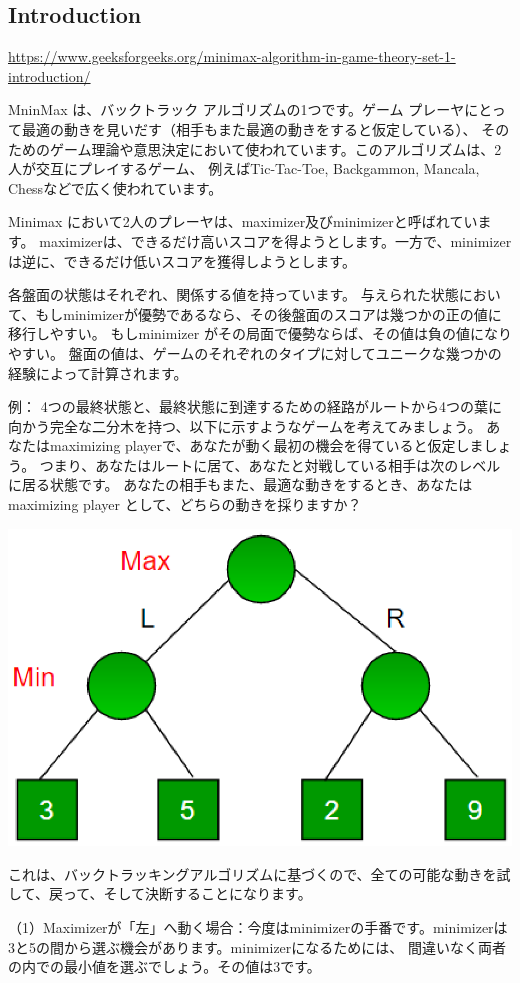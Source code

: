 \documentclass[uplatex,a4paper,11pt,oneside,openany]{jsbook}
\begin{document}
\subsection{Introduction}

\url{https://www.geeksforgeeks.org/minimax-algorithm-in-game-theory-set-1-introduction/}

MninMax は、バックトラック アルゴリズムの1つです。ゲーム プレーヤにとって最適の動きを見いだす（相手もまた最適の動きをすると仮定している）、
そのためのゲーム理論や意思決定において使われています。このアルゴリズムは、2人が交互にプレイするゲーム、
例えばTic-Tac-Toe, Backgammon, Mancala, Chessなどで広く使われています。

Minimax において2人のプレーヤは、maximizer及びminimizerと呼ばれています。
maximizerは、できるだけ高いスコアを得ようとします。一方で、minimizerは逆に、できるだけ低いスコアを獲得しようとします。

各盤面の状態はそれぞれ、関係する値を持っています。
与えられた状態において、もしminimizerが優勢であるなら、その後盤面のスコアは幾つかの正の値に移行しやすい。
もしminimizer がその局面で優勢ならば、その値は負の値になりやすい。
盤面の値は、ゲームのそれぞれのタイプに対してユニークな幾つかの経験によって計算されます。

例：
4つの最終状態と、最終状態に到達するための経路がルートから4つの葉に向かう完全な二分木を持つ、以下に示すようなゲームを考えてみましょう。
あなたはmaximizing playerで、あなたが動く最初の機会を得ていると仮定しましょう。
つまり、あなたはルートに居て、あなたと対戦している相手は次のレベルに居る状態です。
あなたの相手もまた、最適な動きをするとき、あなたはmaximizing player として、どちらの動きを採りますか？

\begin{center}
  \includegraphics[width=0.4\hsize]{figures/eps/minmax001.eps}
\end{center}

これは、バックトラッキングアルゴリズムに基づくので、全ての可能な動きを試して、戻って、そして決断することになります。

（1）Maximizerが「左」へ動く場合：今度はminimizerの手番です。minimizerは3と5の間から選ぶ機会があります。minimizerになるためには、
間違いなく両者の内での最小値を選ぶでしょう。その値は3です。
\end{document}
